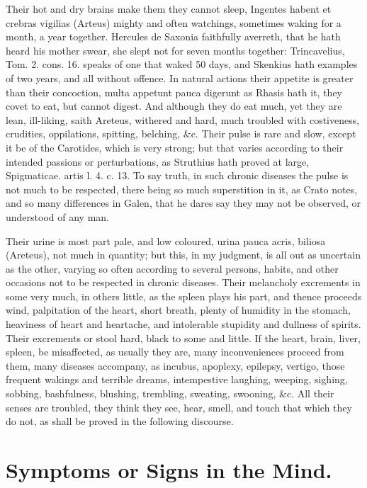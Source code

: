 {Their hot and dry brains make them they cannot sleep, Ingentes habent
et crebras vigilias (Arteus) mighty and often watchings, sometimes
waking for a month, a year together. Hercules de Saxonia
faithfully averreth, that he hath heard his mother swear, she slept not
for seven months together: Trincavelius, Tom. 2. cons. 16. speaks of
one that waked 50 days, and Skenkius hath examples of two years, and
all without offence. In natural actions their appetite is greater than
their concoction, multa appetunt pauca digerunt as Rhasis hath it, they
covet to eat, but cannot digest. And although they do eat much,
yet they are lean, ill-liking, saith Areteus, withered and hard, much
troubled with costiveness, crudities, oppilations, spitting, belching,
\&c. Their pulse is rare and slow, except it be of the Carotides,
which is very strong; but that varies according to their intended
passions or perturbations, as Struthius hath proved at large,
Spigmaticae. artis l. 4. c. 13. To say truth, in such chronic diseases
the pulse is not much to be respected, there being so much superstition
in it, as Crato notes, and so many differences in Galen, that he
dares say they may not be observed, or understood of any man.

Their urine is most part pale, and low coloured, urina pauca acris,
biliosa (Areteus), not much in quantity; but this, in my judgment, is
all out as uncertain as the other, varying so often according to
several persons, habits, and other occasions not to be respected in
chronic diseases. Their melancholy excrements in some very much,
in others little, as the spleen plays his part, and thence proceeds
wind, palpitation of the heart, short breath, plenty of humidity in the
stomach, heaviness of heart and heartache, and intolerable stupidity
and dullness of spirits. Their excrements or stool hard, black to some
and little. If the heart, brain, liver, spleen, be misaffected, as
usually they are, many inconveniences proceed from them, many diseases
accompany, as incubus, apoplexy, epilepsy, vertigo, those
frequent wakings and terrible dreams, intempestive laughing,
weeping, sighing, sobbing, bashfulness, blushing, trembling, sweating,
swooning, \&c. All their senses are troubled, they think they see,
hear, smell, and touch that which they do not, as shall be proved in
the following discourse.

\section{Symptoms or Signs in the Mind.}

}
